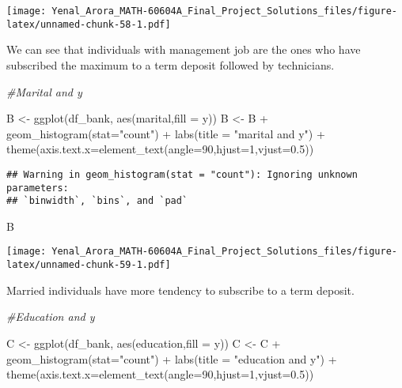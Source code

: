 \documentclass[
]{article}
\newenvironment{Shaded}{\begin{snugshade}}{\end{snugshade}}
\newcommand{\AttributeTok}[1]{\textcolor[rgb]{0.77,0.63,0.00}{#1}}
\newcommand{\CommentTok}[1]{\textcolor[rgb]{0.56,0.35,0.01}{\textit{#1}}}
\newcommand{\DecValTok}[1]{\textcolor[rgb]{0.00,0.00,0.81}{#1}}
\newcommand{\FloatTok}[1]{\textcolor[rgb]{0.00,0.00,0.81}{#1}}
\newcommand{\FunctionTok}[1]{\textcolor[rgb]{0.00,0.00,0.00}{#1}}
\newcommand{\NormalTok}[1]{#1}
\newcommand{\OtherTok}[1]{\textcolor[rgb]{0.56,0.35,0.01}{#1}}
\newcommand{\SpecialCharTok}[1]{\textcolor[rgb]{0.00,0.00,0.00}{#1}}
\newcommand{\StringTok}[1]{\textcolor[rgb]{0.31,0.60,0.02}{#1}}
\begin{document}
\texttt{[image: Yenal\_Arora\_MATH-60604A\_Final\_Project\_Solutions\_files/figure-latex/unnamed-chunk-58-1.pdf]}

We can see that individuals with management job are the ones who have
subscribed the maximum to a term deposit followed by technicians.

\begin{Shaded}
\begin{Highlighting}[]
\CommentTok{\#Marital and y}

\NormalTok{B }\OtherTok{\textless{}{-}} \FunctionTok{ggplot}\NormalTok{(df\_bank, }\FunctionTok{aes}\NormalTok{(marital,}\AttributeTok{fill =}\NormalTok{ y))}
\NormalTok{B }\OtherTok{\textless{}{-}}\NormalTok{ B }\SpecialCharTok{+} \FunctionTok{geom\_histogram}\NormalTok{(}\AttributeTok{stat=}\StringTok{"count"}\NormalTok{) }\SpecialCharTok{+} \FunctionTok{labs}\NormalTok{(}\AttributeTok{title =} \StringTok{"marital and y"}\NormalTok{) }\SpecialCharTok{+}
  \FunctionTok{theme}\NormalTok{(}\AttributeTok{axis.text.x=}\FunctionTok{element\_text}\NormalTok{(}\AttributeTok{angle=}\DecValTok{90}\NormalTok{,}\AttributeTok{hjust=}\DecValTok{1}\NormalTok{,}\AttributeTok{vjust=}\FloatTok{0.5}\NormalTok{))}
\end{Highlighting}
\end{Shaded}

\begin{verbatim}
## Warning in geom_histogram(stat = "count"): Ignoring unknown parameters:
## `binwidth`, `bins`, and `pad`
\end{verbatim}

\begin{Shaded}
\begin{Highlighting}[]
\NormalTok{B}
\end{Highlighting}
\end{Shaded}

\texttt{[image: Yenal\_Arora\_MATH-60604A\_Final\_Project\_Solutions\_files/figure-latex/unnamed-chunk-59-1.pdf]}

Married individuals have more tendency to subscribe to a term deposit.

\begin{Shaded}
\begin{Highlighting}[]
\CommentTok{\#Education and y}

\NormalTok{C }\OtherTok{\textless{}{-}} \FunctionTok{ggplot}\NormalTok{(df\_bank, }\FunctionTok{aes}\NormalTok{(education,}\AttributeTok{fill =}\NormalTok{ y))}
\NormalTok{C }\OtherTok{\textless{}{-}}\NormalTok{ C }\SpecialCharTok{+} \FunctionTok{geom\_histogram}\NormalTok{(}\AttributeTok{stat=}\StringTok{"count"}\NormalTok{) }\SpecialCharTok{+} \FunctionTok{labs}\NormalTok{(}\AttributeTok{title =} \StringTok{"education and y"}\NormalTok{) }\SpecialCharTok{+}
  \FunctionTok{theme}\NormalTok{(}\AttributeTok{axis.text.x=}\FunctionTok{element\_text}\NormalTok{(}\AttributeTok{angle=}\DecValTok{90}\NormalTok{,}\AttributeTok{hjust=}\DecValTok{1}\NormalTok{,}\AttributeTok{vjust=}\FloatTok{0.5}\NormalTok{))}
\end{Highlighting}
\end{Shaded}
\end{document}
